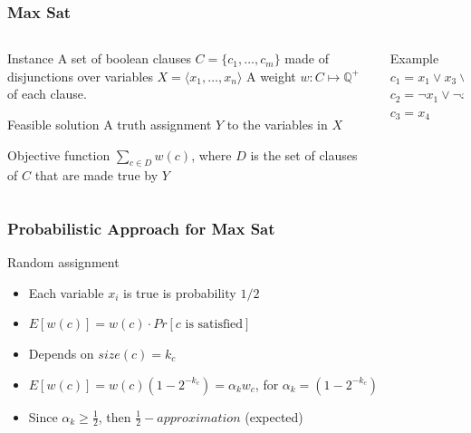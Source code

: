 \documentclass[12pt,aspectratio=169]{beamer}
\begin{document}
\begin{frame}\frametitle{Max Sat}
\begin{columns} 
  \begin{column}{0.48\textwidth}
  \begin{block}{Instance}
    A set of boolean clauses $C=\{c_{1}, \ldots, c_{m}\}$ made of disjunctions over
  variables $X=\langle x_{1}, \ldots, x_{n}\rangle$
%
  A weight $w:C\mapsto \mathbb{Q}^{+}$ of each clause.
%
  \end{block}
  \begin{block}{Feasible solution}
    A truth assignment $Y$ to  the variables in $X$
  \end{block}
  \begin{block}{Objective function}
    $\sum_{c\in D} w(c)$, where $D$ is the set of clauses of $C$ that are made true by $Y$
  \end{block}
\end{column}
    
    \begin{column}{0.4\textwidth}
      \begin{block}{Example}
        $c_{1} = x_{1} \vee x_{3} \vee \neg x_{5}$\\
        $c_{2} = \neg x_{1} \vee \neg x_{2}$\\
        $c_{3} = x_{4}$
      \end{block}
    \end{column}
\end{columns}
\end{frame}


\begin{frame}\frametitle{Probabilistic Approach for Max Sat}
  \begin{block}{Random assignment}
    \begin{itemize}
    \item
      Each variable $x_{i}$ is true is probability $1/2$
    \item
      $E[w(c)] = w(c) \cdot Pr[c\text{ is satisfied}]$
    \item
      Depends on $size(c) = k_{c}$
    \item
      $E[w(c)] = w(c) \left( 1 - 2^{-k_{c}}\right) = \alpha_{k} w_{c}$, for $\alpha_{k} =
      \left( 1 - 2^{-k_{c}}\right)$
    \item
      Since $\alpha_{k}\ge \frac{1}{2}$, then $\frac{1}{2}-approximation$ (expected)
    \end{itemize}
  \end{block}
\end{frame}
  
\end{document}

